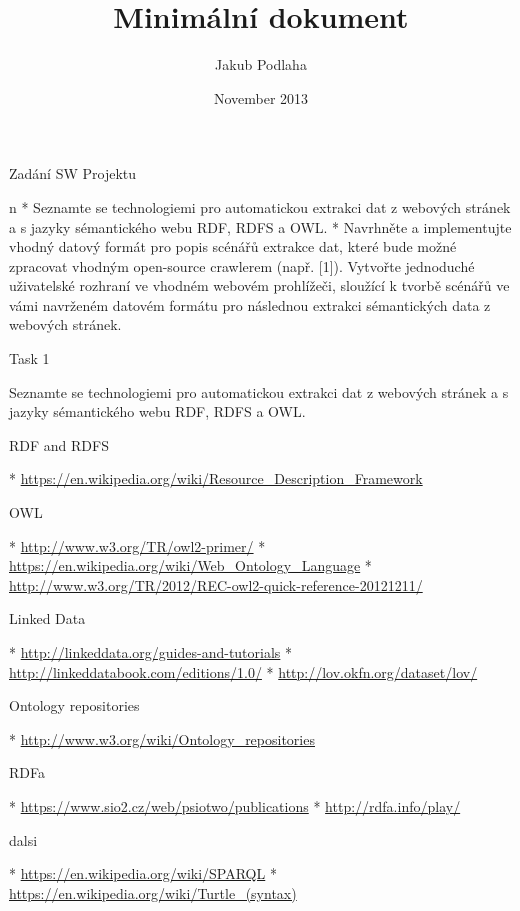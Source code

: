 
\worktype [M/CZ]
\title {Minimální dokument}
\author {Jakub Podlaha}
\date {November 2013}
\makefront

\chap Zadání SW Projektu

\begitems \style n
  * Seznamte se technologiemi pro automatickou extrakci dat z webových stránek
    a s jazyky sémantického webu RDF, RDFS a OWL.
  * Navrhněte a implementujte vhodný datový formát pro popis scénářů extrakce
    dat, které bude možné zpracovat vhodným open-source crawlerem (např.  [1]).
    Vytvořte jednoduché uživatelské rozhraní ve vhodném webovém prohlížeči,
    sloužící k tvorbě scénářů ve vámi navrženém datovém formátu pro následnou
    extrakci sémantických data z webových stránek. 
\enditems


\chap Task 1

Seznamte se technologiemi pro automatickou extrakci dat z webových stránek a s
jazyky sémantického webu RDF, RDFS a OWL.


\sec RDF and RDFS

\begitems
 * \url{https://en.wikipedia.org/wiki/Resource_Description_Framework}
\enditems


\sec OWL

\begitems
 * \url{http://www.w3.org/TR/owl2-primer/}
 * \url{https://en.wikipedia.org/wiki/Web_Ontology_Language}
 * \url{http://www.w3.org/TR/2012/REC-owl2-quick-reference-20121211/}
\enditems


\sec Linked Data

\begitems
 * \url{http://linkeddata.org/guides-and-tutorials}
 * \url{http://linkeddatabook.com/editions/1.0/}
 * \url{http://lov.okfn.org/dataset/lov/}
\enditems


\sec Ontology repositories

\begitems
 * \url{http://www.w3.org/wiki/Ontology_repositories}
\enditems


\sec RDFa

\begitems
 * \url{https://www.sio2.cz/web/psiotwo/publications}
 * \url{http://rdfa.info/play/}
\enditems


\sec dalsi

\begitems
 * \url{https://en.wikipedia.org/wiki/SPARQL}
 * \url{https://en.wikipedia.org/wiki/Turtle_(syntax)}
\enditems


